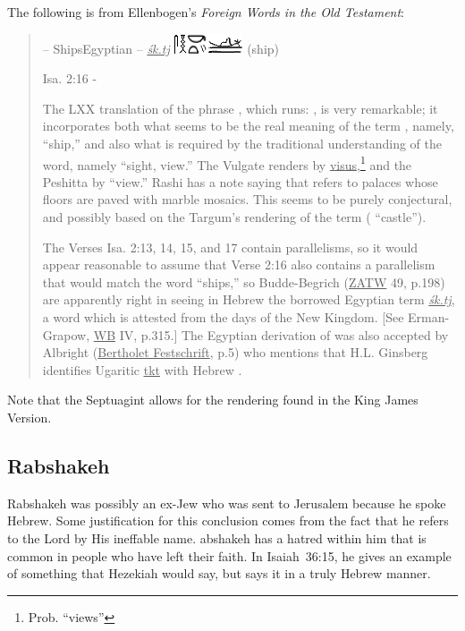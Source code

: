The following is from Ellenbogen's \textit{Foreign Words in the Old Testament}:
\begin{quotation}
    {\noindent{} -- Ships\hfill Egyptian -- \underline{\textit{\'sk.tj}} \includegraphics[scale=1.1]{images/egt-ship} (ship)}
    
    {\noindent Isa. 2:16 -}
    
    The LXX translation of the phrase , which runs: , is very remarkable; it incorporates both what seems to be the real meaning of the term , namely,  ``ship,'' and also what is required by the traditional understanding of the word, namely  ``sight, view.'' The Vulgate renders  by \underline{visus},\footnote{Prob. ``views''} and the Peshitta by  ``view.'' Rashi has a note saying that  refers to palaces whose floors are paved with marble mosaics. This seems to be purely conjectural, and possibly based on the Targum's rendering of the term ( ``castle'').
    
    The Verses Isa. 2:13, 14, 15, and 17 contain parallelisms, so it would appear reasonable to assume that Verse 2:16 also contains a parallelism that would match the word  ``ships,'' so Budde-Begrich (\underline{ZATW} 49, p.198) are apparently right in seeing in Hebrew  the borrowed Egyptian term \underline{\textit{\'sk.tj}}, a word which is attested from the days of the New Kingdom. [See Erman-Grapow, \underline{WB} IV, p.315.] The Egyptian derivation of  was also accepted by Albright (\underline{Bertholet Festschrift}, p.5) who mentions that H.L. Ginsberg identifies Ugaritic \underline{\underline{t}}\underline{kt} with Hebrew .
\end{quotation}

Note that the Septuagint allows for the rendering found in the King James Version.

\subsection{Rabshakeh}\label{app:rabshakeh}
Rabshakeh was possibly an ex-Jew who was sent to Jerusalem because he spoke Hebrew. Some justification for this conclusion comes from the fact that he refers to the Lord by His ineffable name. abshakeh has a hatred within him that is common in people who have left their faith. In Isaiah~36:15, he gives an example of something that Hezekiah would say, but says it in a truly Hebrew manner.
